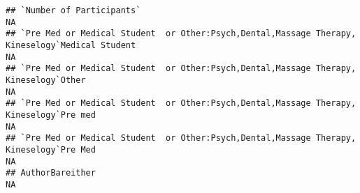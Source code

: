 \documentclass[]{article}
\begin{document}
\begin{verbatim}
## `Number of Participants`                                                                                                                                                                                                                                                                                                                                                                                                                                                                NA
## `Pre Med or Medical Student  or Other:Psych,Dental,Massage Therapy, Kineselogy`Medical Student                                                                                                                                                                                                                                                                                                                                                                                          NA
## `Pre Med or Medical Student  or Other:Psych,Dental,Massage Therapy, Kineselogy`Other                                                                                                                                                                                                                                                                                                                                                                                                    NA
## `Pre Med or Medical Student  or Other:Psych,Dental,Massage Therapy, Kineselogy`Pre med                                                                                                                                                                                                                                                                                                                                                                                                  NA
## `Pre Med or Medical Student  or Other:Psych,Dental,Massage Therapy, Kineselogy`Pre Med                                                                                                                                                                                                                                                                                                                                                                                                  NA
## AuthorBareither                                                                                                                                                                                                                                                                                                                                                                                                                                                                         NA

\end{verbatim}
\end{document}
